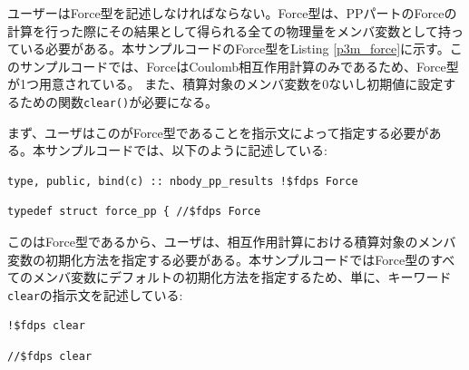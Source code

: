 ユーザーはForce型を記述しなければならない。Force型は、PPパートのForceの計算を行った際にその結果として得られる全ての物理量をメンバ変数として持っている必要がある。本サンプルコードのForce型をListing \ref{p3m_force}に示す。このサンプルコードでは、ForceはCoulomb相互作用計算のみであるため、Force型が1つ用意されている。
\ifCpp %
また、積算対象のメンバ変数を0ないし初期値に設定するための関数\texttt{clear()}が必要になる。
\endifCpp

\ifCpp %

\endifCpp
\ifFtn %

\endifFtn
\ifC %

\endifC

\ifIF %
まず、ユーザはこの\structure がForce型であることを指示文によって指定する必要がある。本サンプルコードでは、以下のように記述している:
\endifIF
\ifFtn %
\begin{screen}
\begin{verbatim}
type, public, bind(c) :: nbody_pp_results !$fdps Force
\end{verbatim}
\end{screen}
\endifFtn
\ifC %
\begin{screen}
\begin{verbatim}
typedef struct force_pp { //$fdps Force
\end{verbatim}
\end{screen}
\endifC
\ifIF %
この\structure はForce型であるから、ユーザは、相互作用計算における積算対象のメンバ変数の初期化方法を指定する必要がある。本サンプルコードではForce型のすべてのメンバ変数にデフォルトの初期化方法を指定するため、単に、キーワード\texttt{clear}の指示文を記述している:
\endifIF
\ifFtn %
\begin{screen}
\begin{verbatim}
!$fdps clear
\end{verbatim}
\end{screen}
\endifFtn
\ifC %
\begin{screen}
\begin{verbatim}
//$fdps clear
\end{verbatim}
\end{screen}
\endifC

